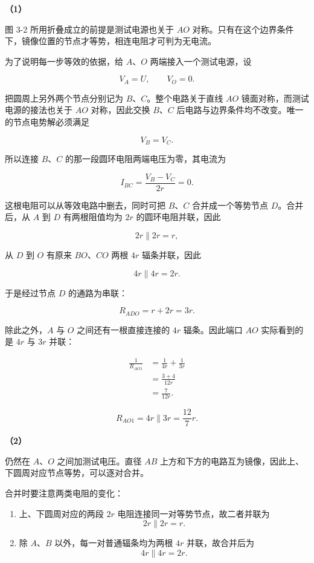 \documentclass[12pt,a4paper,UTF8]{ctexart}
\newcommand{\tightlist}{\setlength{\itemsep}{0pt}\setlength{\parskip}{0pt}}
\begin{document}
\textbf{（1）}

图 3-2 所用折叠成立的前提是测试电源也关于 \(AO\)
对称。只有在这个边界条件下，镜像位置的节点才等势，相连电阻才可判为无电流。

为了说明每一步等效的依据，给 \(A\)、\(O\) 两端接入一个测试电源，设

\[V_A=U,\qquad V_O=0.\]

把圆周上另外两个节点分别记为 \(B\)、\(C\)。整个电路关于直线 \(AO\)
镜面对称，而测试电源的接法也关于 \(AO\) 对称，因此交换 \(B\)、\(C\)
后电路与边界条件均不改变。唯一的节点电势解必须满足

\[V_B=V_C.\]

所以连接 \(B\)、\(C\) 的那一段圆环电阻两端电压为零，其电流为

\[I_{BC}=\frac{V_B-V_C}{2r}=0.\]

这根电阻可以从等效电路中删去，同时可把 \(B\)、\(C\) 合并成一个等势节点
\(D\)。合并后，从 \(A\) 到 \(D\) 有两根阻值均为 \(2r\)
的圆环电阻并联，因此

\[2r\parallel2r=r,\]

从 \(D\) 到 \(O\) 有原来 \(BO\)、\(CO\) 两根 \(4r\) 辐条并联，因此

\[4r\parallel4r=2r.\]

于是经过节点 \(D\) 的通路为串联：

\[R_{ADO}=r+2r=3r.\]

除此之外，\(A\) 与 \(O\) 之间还有一根直接连接的 \(4r\) 辐条。因此端口
\(AO\) 实际看到的是 \(4r\) 与 \(3r\) 并联：

\[\begin{aligned}
\frac1{R_{AO1}}
&=\frac1{4r}+\frac1{3r}\\
&=\frac{3+4}{12r}\\
&=\frac7{12r}.
\end{aligned}\]

\[\boxed{R_{AO1}=4r\parallel3r=\frac{12}{7}r}.\]

\textbf{（2）}

仍然在 \(A\)、\(O\) 之间加测试电压。直径 \(AB\)
上方和下方的电路互为镜像，因此上、下圆周对应节点等势，可以逐对合并。

合并时要注意两类电阻的变化：

\begin{enumerate}
\def\labelenumi{\arabic{enumi}.}
\tightlist
\item
  上、下圆周对应的两段 \(2r\) 电阻连接同一对等势节点，故二者并联为
  \[2r\parallel2r=r.\]
\item
  除 \(A\)、\(B\) 以外，每一对普通辐条均为两根 \(4r\) 并联，故合并后为
  \[4r\parallel4r=2r.\]
\end{enumerate}
\end{document}
